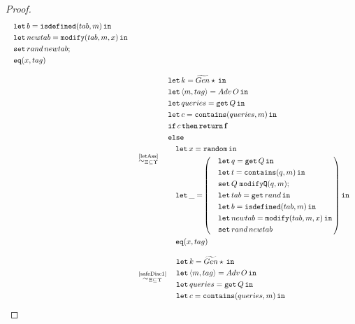 \begin{proof}
{\begin{align*}
\begin{aligned}
        &\quad\letin{b = \mathtt{isdefined}(tab, m)}{} \\
        &\quad \letin{newtab = \mathtt{modify}(tab, m, x)}{} \\
        &\quad \mathtt{set}\,rand\,newtab; \\
        &\quad \mathtt{eq}(x,tag)
    \end{aligned}
    \\[2ex]
    &\quad\overset{\text{\ref{letAss}}}{\simcontext}\quad
    \begin{aligned}
        &\letin{k = \widetilde{Gen} \star}{} \\
        &\letin{\lis{m,tag} = Adv\,O}{} \\
        &\letin{queries = \get Q}{} \\
        &\letin{c=\mathtt{contains}(queries, m)}{} \\
        & \mathtt{if}\, c\, \mathtt{then} \, \return \false \\
        &\mathtt{else} \\
        &\quad \letin{x = \random}{} \\
        &\quad \mathtt{let}\,{\_=} \left(
        \begin{aligned}
            &\quad\letin{q=\get Q}{} \\
            &\quad\letin{t=\mathtt{contains}(q,m)}{} \\
            &\quad \mathtt{set}\,Q\;\mathtt{modifyQ}(q, m); \\
            &\quad\letin{tab = \mathtt{get}\,rand}{} \\
            &\quad\letin{b = \mathtt{isdefined}(tab, m)}{} \\
            &\quad \letin{newtab = \mathtt{modify}(tab, m, x)}{} \\
            &\quad \mathtt{set}\,rand\,newtab
        \end{aligned}
        \right) \mathtt{in} \\
        &\quad \mathtt{eq}(x,tag)
    \end{aligned}
    \\[2ex]
    &\quad\overset{\text{\ref{safeDisc1}}}{\simcontext}\quad
    \begin{aligned}
        &\letin{k = \widetilde{Gen} \star}{} \\
        &\letin{\lis{m,tag} = Adv\,O}{} \\
        &\letin{queries = \get Q}{} \\
        &\letin{c=\mathtt{contains}(queries, m)}{} \\

\end{aligned}
\end{align*}}
\end{proof}
